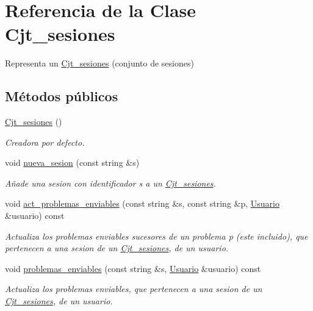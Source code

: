 \hypertarget{class_cjt__sesiones}{}\section{Referencia de la Clase Cjt\+\_\+sesiones}
\label{class_cjt__sesiones}


Representa un \mbox{\hyperlink{class_cjt__sesiones}{Cjt\+\_\+sesiones}} (conjunto de sesiones)  


\subsection*{Métodos públicos}
\begin{DoxyCompactItemize}
\item 
\mbox{\hyperlink{class_cjt__sesiones_a70107165db028c20e245f02958a47be1}{Cjt\+\_\+sesiones}} ()
\begin{DoxyCompactList}\small\item\em Creadora por defecto. \end{DoxyCompactList}\item 
void \mbox{\hyperlink{class_cjt__sesiones_a7436186b6a6b34354ab5303f6b8bcfa9}{nueva\+\_\+sesion}} (const string \&s)
\begin{DoxyCompactList}\small\item\em Añade una sesion con identificador s a un \mbox{\hyperlink{class_cjt__sesiones}{Cjt\+\_\+sesiones}}. \end{DoxyCompactList}\item 
void \mbox{\hyperlink{class_cjt__sesiones_a643292089a9534d7eea048df779e00fd}{act\+\_\+problemas\+\_\+enviables}} (const string \&s, const string \&p, \mbox{\hyperlink{class_usuario}{Usuario}} \&usuario) const
\begin{DoxyCompactList}\small\item\em Actualiza los problemas enviables sucesores de un problema p (este incluido), que pertenecen a una sesion de un \mbox{\hyperlink{class_cjt__sesiones}{Cjt\+\_\+sesiones}}, de un usuario. \end{DoxyCompactList}\item 
void \mbox{\hyperlink{class_cjt__sesiones_a52b36f12479444065510c1acfb235dfe}{problemas\+\_\+enviables}} (const string \&s, \mbox{\hyperlink{class_usuario}{Usuario}} \&usuario) const
\begin{DoxyCompactList}\small\item\em Actualiza los problemas enviables, que pertenecen a una sesion de un \mbox{\hyperlink{class_cjt__sesiones}{Cjt\+\_\+sesiones}}, de un usuario. \end{DoxyCompactList}\item 

\end{DoxyCompactItemize}
